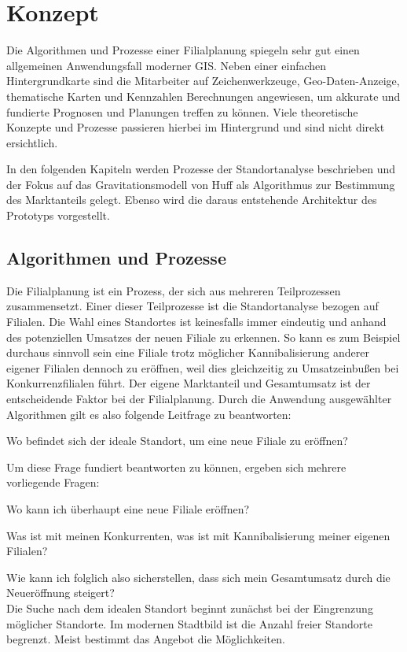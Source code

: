 \chapter{Konzept}
\label{ch:concept}
Die Algorithmen und Prozesse einer Filialplanung spiegeln sehr gut einen allgemeinen Anwendungsfall moderner GIS. 
Neben einer einfachen Hintergrundkarte sind die Mitarbeiter auf Zeichenwerkzeuge, Geo-Daten-Anzeige, thematische Karten und Kennzahlen Berechnungen angewiesen, um akkurate und fundierte Prognosen und Planungen treffen zu können.
Viele theoretische Konzepte und Prozesse passieren hierbei im Hintergrund und sind nicht direkt ersichtlich.


In den folgenden Kapiteln werden Prozesse der Standortanalyse beschrieben und der Fokus auf das Gravitationsmodell von Huff als Algorithmus zur Bestimmung des Marktanteils gelegt.
Ebenso wird die daraus entstehende Architektur des Prototyps vorgestellt.
\section{Algorithmen und Prozesse}
Die Filialplanung ist ein Prozess, der sich aus mehreren Teilprozessen zusammensetzt. 
Einer dieser Teilprozesse ist die Standortanalyse bezogen auf Filialen.
Die Wahl eines Standortes ist keinesfalls immer eindeutig und anhand des potenziellen Umsatzes der neuen Filiale zu erkennen.
So kann es zum Beispiel durchaus sinnvoll sein eine Filiale trotz möglicher Kannibalisierung anderer eigener Filialen dennoch zu eröffnen, weil dies gleichzeitig zu Umsatzeinbußen bei Konkurrenzfilialen führt. 
Der eigene Marktanteil und Gesamtumsatz ist der entscheidende Faktor bei der Filialplanung.
Durch die Anwendung ausgewählter Algorithmen gilt es also folgende Leitfrage zu beantworten:

Wo befindet sich der ideale Standort, um eine neue Filiale zu eröffnen?

Um diese Frage fundiert beantworten zu können, ergeben sich mehrere vorliegende Fragen:

Wo kann ich überhaupt eine neue Filiale eröffnen?

Was ist mit meinen Konkurrenten, was ist mit Kannibalisierung meiner eigenen Filialen?

Wie kann ich folglich also sicherstellen, dass sich mein Gesamtumsatz durch die Neueröffnung steigert?\\

Die Suche nach dem idealen Standort beginnt zunächst bei der Eingrenzung möglicher Standorte.
Im modernen Stadtbild ist die Anzahl freier Standorte begrenzt.
Meist bestimmt das Angebot die Möglichkeiten.

